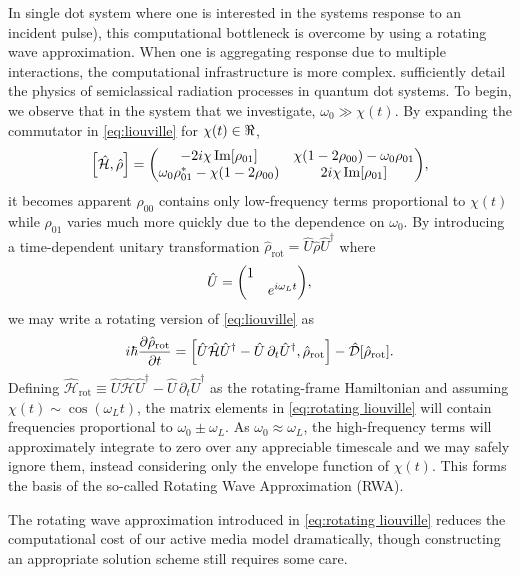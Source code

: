 \documentclass[conference]{IEEEtran}
\begin{document}
In single dot system where one is interested in the systems response to an incident pulse), this computational bottleneck is overcome by using a rotating wave approximation. When one is aggregating response due to multiple interactions, the computational infrastructure is more complex.  sufficiently detail the physics of semiclassical radiation processes in quantum dot systems. To begin, we observe that in the system that we investigate, $\omega_0 \gg \chi(t)$. By expanding the commutator in \cref{eq:liouville} for $\chi(t) \in \real$,
\begin{equation}
  \commutator{\hat{\mathcal{H}}}{\hat{\rho}} =
  \mqty(
    -2 i \chi \Im[\rho_{01}] & \chi\qty(1 - 2 \rho_{00}) - \omega_0 \rho_{01} \\
    \omega_0 \rho_{01}^* - \chi\qty(1 - 2\rho_{00}) & 2 i \chi \Im[\rho_{01}]
  ),
\end{equation}
it becomes apparent $\rho_{00}$ contains only low-frequency terms proportional to $\chi(t)$ while $\rho_{01}$ varies much more quickly due to the dependence on $\omega_0$.
By introducing a time-dependent unitary transformation $\hat{\rho}_\text{rot} = \hat{U}\hat{\rho}\hat{U}^\dagger$ where
\begin{equation}
  \hat{U} = \mqty(\dmat{1, e^{i \omega_L t}}),
  \label{eq:unitary transformation}
\end{equation}
we may write a rotating version of \cref{eq:liouville} as
\begin{equation}
  i \hbar \pdv{\hat{\rho}_\text{rot}}{t} = \commutator{\hat{U} \hat{\mathcal{H}} \hat{U}^\dagger - \hat{U} \, \partial_t \hat{U}^\dagger}{\hat{\rho}_\text{rot}} - \hat{\mathcal{D}}[\hat{\rho}_\text{rot}].
  \label{eq:rotating liouville}
\end{equation}
Defining $\hat{\mathcal{H}}_\text{rot} \equiv \hat{U} \hat{\mathcal{H}} \hat{U}^\dagger - \hat{U} \, \partial_t \hat{U}^\dagger$ as the rotating-frame Hamiltonian and assuming $\chi(t) \sim \cos(\omega_L t)$, the matrix elements in \cref{eq:rotating liouville} will contain frequencies proportional to $\omega_0 \pm \omega_L$.
As $\omega_0 \approx \omega_L$, the high-frequency terms will approximately integrate to zero over any appreciable timescale and we may safely ignore them, instead considering only the envelope function of $\chi(t)$. This forms the basis of the so-called Rotating Wave Approximation (RWA)\cite{Allen1987}.


The rotating wave approximation introduced in \cref{eq:rotating liouville} reduces the computational cost of our active media model dramatically, though constructing an appropriate solution scheme still requires some care.
\end{document}
